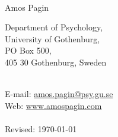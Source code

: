 \documentclass[10pt]{article}
\newcommand{\RR}{\textcolor{grayrule}{\rule[3mm]{\textwidth}{0.5pt}}}
\begin{document}
\thispagestyle{empty}
\begin{center}
\textsc{} \\[\baselineskip]
{\fontsize{18}{48} \selectfont Amos Pagin} \vspace{1.35\baselineskip}
\end{center}


\begin{minipage}[t]{0.7\linewidth}
Department of Psychology,  \\ 
University of Gothenburg, \\
  PO Box 500,  \\
 405 30 Gothenburg, Sweden\\ \\
 \end{minipage}
 \begin{minipage}[t]{0.5\linewidth}
 E-mail: \href{mailto: amos.pagin@psy.gu.se}{amos.pagin@psy.gu.se}\\
 Web: \href{https://www.amospagin.com}{www.amospagin.com} \\ \\
Revised: \today
 \end{minipage}

%

%
%
\end{document}
